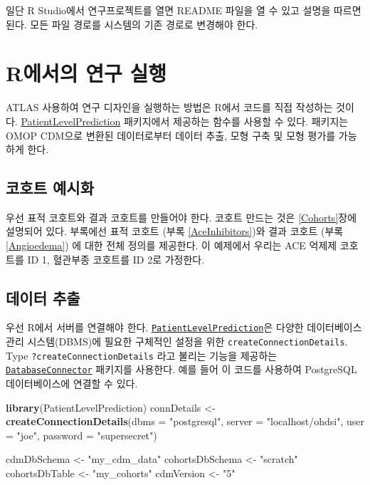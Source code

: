 \documentclass[11pt]{book}
\newenvironment{Shaded}{\begin{snugshade}}{\end{snugshade}}
\newcommand{\KeywordTok}[1]{\textcolor[rgb]{0.13,0.29,0.53}{\textbf{#1}}}
\newcommand{\DataTypeTok}[1]{\textcolor[rgb]{0.13,0.29,0.53}{#1}}
\newcommand{\StringTok}[1]{\textcolor[rgb]{0.31,0.60,0.02}{#1}}
\newcommand{\NormalTok}[1]{#1}
\theoremstyle{definition}
\theoremstyle{definition}
\theoremstyle{definition}
\theoremstyle{remark}
\begin{document}
일단 R Studio에서 연구프로젝트를 열면 README 파일을 열 수 있고 설명을
따르면 된다. 모든 파일 경로를 시스템의 기존 경로로 변경해야 한다.

\section{R에서의 연구 실행}\label{r--}

ATLAS 사용하여 연구 디자인을 실행하는 방법은 R에서 코드를 직접 작성하는
것이다.
\href{https://ohdsi.github.io/PatientLevelPrediction/}{PatientLevelPrediction}
패키지에서 제공하는 함수를 사용할 수 있다. 패키지는 OMOP CDM으로 변환된
데이터로부터 데이터 추출, 모형 구축 및 모형 평가를 가능하게 한다.

\subsection{코호트 예시화}\label{-}

우선 표적 코호트와 결과 코호트를 만들어야 한다. 코호트 만드는 것은
\ref{Cohorts}장에 설명되어 있다. 부록에선 표적 코호트 (부록
\ref{AceInhibitors})와 결과 코호트 (부록 \ref{Angioedema}) 에 대한 전체
정의를 제공한다. 이 예제에서 우리는 ACE 억제제 코호트를 ID 1, 혈관부종
코호트를 ID 2로 가정한다.

\subsection{데이터 추출}\label{--1}

우선 R에서 서버를 연결해야 한다.
\href{https://ohdsi.github.io/PatientLevelPrediction/}{\texttt{PatientLevelPrediction}}은
다양한 데이터베이스 관리 시스템(DBMS)에 필요한 구체적인 설정을 위한
\texttt{createConnectionDetails}. Type \texttt{?createConnectionDetails}
라고 불리는 기능을 제공하는
\href{https://ohdsi.github.io/DatabaseConnector/}{\texttt{DatabaseConnector}}
패키지를 사용한다. 예를 들어 이 코드를 사용하여 PostgreSQL
데이터베이스에 연결할 수 있다.

\begin{Shaded}
\begin{Highlighting}[]
\KeywordTok{library}\NormalTok{(PatientLevelPrediction)}
\NormalTok{connDetails <-}\StringTok{ }\KeywordTok{createConnectionDetails}\NormalTok{(}\DataTypeTok{dbms =} \StringTok{"postgresql"}\NormalTok{,}
                                       \DataTypeTok{server =} \StringTok{"localhost/ohdsi"}\NormalTok{,}
                                       \DataTypeTok{user =} \StringTok{"joe"}\NormalTok{,}
                                       \DataTypeTok{password =} \StringTok{"supersecret"}\NormalTok{)}

\NormalTok{cdmDbSchema <-}\StringTok{ "my_cdm_data"}
\NormalTok{cohortsDbSchema <-}\StringTok{ "scratch"}
\NormalTok{cohortsDbTable <-}\StringTok{ "my_cohorts"}
\NormalTok{cdmVersion <-}\StringTok{ "5"}
\end{Highlighting}
\end{Shaded}
\end{document}
